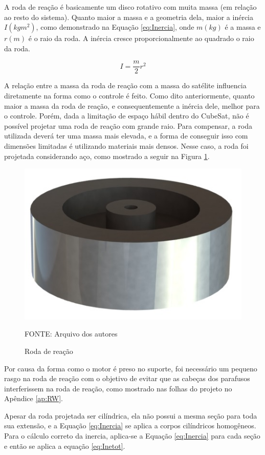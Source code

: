 \documentclass[
	12pt,				%
	openany,			%
	twoside,			%
	a4paper,			%
	english,			%
	french,				%
	spanish,			%
	brazil,				%
	oldfontcommands
	]{abntex2}
\begin{document}
A roda de reação é basicamente um disco rotativo com muita massa (em relação ao resto do sistema). Quanto maior a massa e a geometria dela, maior a inércia $I(kgm^2)$, como demonstrado na Equação \ref{eq:Inercia}, onde $m(kg)$ é a massa e $r(m)$ é o raio da roda. A inércia cresce proporcionalmente ao quadrado o raio da roda.

\begin{equation}
I = \frac{m}{2} r^2
\label{eq:Inercia}
\end{equation}

A relação entre a massa da roda de reação com a massa do satélite influencia diretamente na forma como o controle é feito. Como dito anteriormente, quanto maior a massa da roda de reação, e consequentemente a inércia dele, melhor para o controle. Porém, dada a limitação de espaço hábil dentro do CubeSat, não é possível projetar uma roda de reação com grande raio. Para compensar, a roda utilizada deverá ter uma massa mais elevada, e a forma de conseguir isso com dimensões limitadas é utilizando materiais mais densos. Nesse caso, a roda foi projetada considerando aço, como mostrado a seguir na Figura \ref{fig:RW}.

\begin{figure}[th]
	\caption{Roda de reação}
	\centering
	\includegraphics[width=0.5\linewidth]{./figs/Reaction_Wheel}
	
	\begin{small}
		FONTE: Arquivo dos autores
	\end{small}
	\label{fig:RW}
\end{figure}

Por causa da forma como o motor é preso no suporte, foi necessário um pequeno rasgo na roda de reação com o objetivo de evitar que as cabeças dos parafusos interferissem na roda de reação, como mostrado nas folhas do projeto no Apêndice \ref{ap:RW}.

Apesar da roda projetada ser cilíndrica, ela não possui a mesma seção para toda sua extensão, e a Equação \ref{eq:Inercia} se aplica a corpos cilíndricos homogêneos. Para o cálculo correto da inercia, aplica-se a Equação \ref{eq:Inercia} para cada seção e então se aplica a equação \ref{eq:Inetot}.
\end{document}
